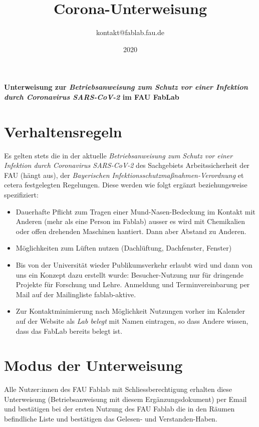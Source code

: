 \documentclass[13pt]{\basedir/fablab-document}
\date{2020}
\author{kontakt@fablab.fau.de}
\title{Corona-Unterweisung}
\begin{document}
\maketitle

\begin{center}
  \textbf{Unterweisung zur \emph{Betriebsanweisung zum Schutz vor einer Infektion durch Coronavirus SARS-CoV-2} im FAU FabLab}
\end{center}

\vbox{\vspace{1cm}}


\section{Verhaltensregeln}
Es gelten stets die in der aktuelle \emph{Betriebsanweisung zum Schutz vor einer Infektion durch Coronavirus SARS-CoV-2} des Sachgebiets Arbeitssicherheit der FAU (hängt aus), der \emph{Bayerischen Infektionsschutzmaßnahmen-Verordnung} et cetera festgelegten Regelungen. Diese werden wie folgt ergänzt beziehungsweise spezifiziert: 

\begin{itemize}
  \item  Dauerhafte Pflicht zum Tragen einer Mund-Nasen-Bedeckung im Kontakt mit Anderen (mehr als eine Person im Fablab) ausser es wird mit Chemikalien oder offen drehenden Maschinen hantiert. Dann aber Abstand zu Anderen.
  \item  Möglichkeiten zum Lüften nutzen (Dachlüftung, Dachfenster, Fenster)
  \item  Bis von der Universität wieder Publikumsverkehr erlaubt wird und dann von uns ein Konzept dazu erstellt wurde: Besucher-Nutzung nur für dringende Projekte für Forschung und Lehre. Anmeldung und Terminvereinbarung per Mail auf der Mailingliste fablab-aktive.
  \item  Zur Kontaktminimierung nach Möglichkeit Nutzungen vorher im Kalender auf der Website als \emph{Lab belegt} mit Namen eintragen, so dass Andere wissen, dass das FabLab bereits belegt ist.
\end{itemize}

\section{Modus der Unterweisung}
Alle Nutzer:innen des FAU Fablab mit Schliessberechtigung erhalten diese Unterweisung (Betriebsanweisung mit diesem Ergänzungsdokument) per Email und bestätigen bei der ersten Nutzung des FAU Fablab die in den Räumen befindliche Liste und bestätigen das Gelesen- und Verstanden-Haben.

\end{document}
